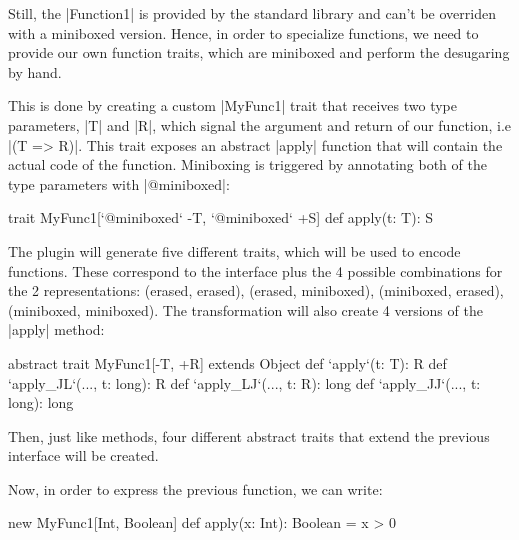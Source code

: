 Still, the |Function1| is provided by the standard library and can't be overriden with a miniboxed version. Hence, in order to specialize functions, we need to provide our own function traits, which are miniboxed and perform the desugaring by hand.

This is done by creating a custom |MyFunc1| trait that receives two type parameters, |T| and |R|, which signal the argument and return of our function, i.e |(T => R)|. This trait exposes an abstract |apply| function that will contain the actual code of the function. Miniboxing is triggered by annotating both of the type parameters with |@miniboxed|:

\begin{lstlisting-nobreak}
 trait MyFunc1[`@miniboxed` -T, `@miniboxed` +S] {
   def apply(t: T): S
 }
\end{lstlisting-nobreak}

The plugin will generate five different traits, which will be used to encode functions. These correspond to the interface plus the 4 possible combinations for the 2 representations: (erased, erased), (erased, miniboxed), (miniboxed, erased), (miniboxed, miniboxed). The transformation will also create 4 versions of the |apply| method:

\begin{lstlisting-nobreak}
  abstract trait MyFunc1[-T, +R] extends Object {
    def `apply`(t: T): R
    def `apply_JL`(..., t: long): R
    def `apply_LJ`(..., t: R): long
    def `apply_JJ`(..., t: long): long
  }
\end{lstlisting-nobreak}

Then, just like methods, four different abstract traits that extend the previous interface will be created.

%

Now, in order to express the previous function, we can write:

\begin{lstlisting-nobreak}
 new MyFunc1[Int, Boolean] { def apply(x: Int): Boolean = x > 0 }
\end{lstlisting-nobreak}

